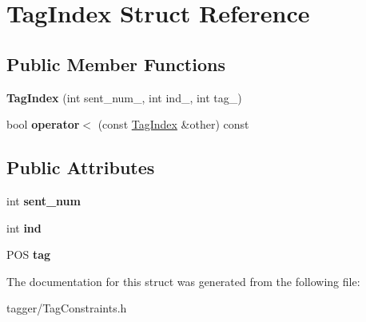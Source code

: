 \hypertarget{struct_tag_index}{
\section{TagIndex Struct Reference}
\label{struct_tag_index}
}
\subsection*{Public Member Functions}
\begin{DoxyCompactItemize}
\item 
\hypertarget{struct_tag_index_a30a1bf326d593304ac3d950fd2b8be92}{
{\bfseries TagIndex} (int sent\_\-num\_\-, int ind\_\-, int tag\_\-)}
\label{struct_tag_index_a30a1bf326d593304ac3d950fd2b8be92}

\item 
\hypertarget{struct_tag_index_a7b858bbf2ed8ed6bb56d87db8d38aaf2}{
bool {\bfseries operator$<$} (const \hyperlink{struct_tag_index}{TagIndex} \&other) const }
\label{struct_tag_index_a7b858bbf2ed8ed6bb56d87db8d38aaf2}

\end{DoxyCompactItemize}
\subsection*{Public Attributes}
\begin{DoxyCompactItemize}
\item 
\hypertarget{struct_tag_index_a9bde045f6de7e99933920b883af894dc}{
int {\bfseries sent\_\-num}}
\label{struct_tag_index_a9bde045f6de7e99933920b883af894dc}

\item 
\hypertarget{struct_tag_index_ac9cd159e647314e5beaf7af6da56fa6e}{
int {\bfseries ind}}
\label{struct_tag_index_ac9cd159e647314e5beaf7af6da56fa6e}

\item 
\hypertarget{struct_tag_index_a1182f316658b96f36ecd7689d790f508}{
POS {\bfseries tag}}
\label{struct_tag_index_a1182f316658b96f36ecd7689d790f508}

\end{DoxyCompactItemize}


The documentation for this struct was generated from the following file:\begin{DoxyCompactItemize}
\item 
tagger/TagConstraints.h\end{DoxyCompactItemize}
